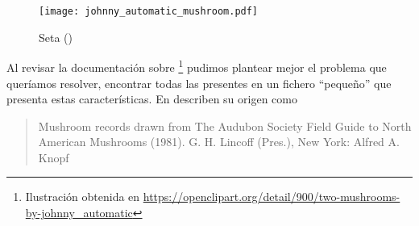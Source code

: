 \begin{wrapfigure}{o}{0.22\textwidth}
  \centering
  \texttt{[image: johnny\_automatic\_mushroom.pdf]}
	\caption{Seta (\mushroom)}
	\label{fig:Seta}
\end{wrapfigure}
Al revisar la documentación sobre \mushroom\footnote{Ilustración obtenida en {\scriptsize\url{https://openclipart.org/detail/900/two-mushrooms-by-johnny_automatic}}} pudimos plantear mejor el problema que queríamos resolver, encontrar todas las \ARs presentes en un fichero "`pequeño"' que presenta estas características. En  describen su origen como
\begin{quote}
   Mushroom records drawn from The Audubon Society Field Guide to North American Mushrooms (1981). G. H. Lincoff (Pres.), New York: Alfred A. Knopf 
\end{quote}

